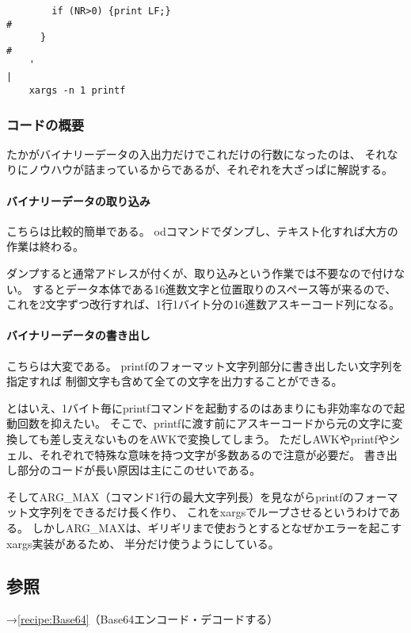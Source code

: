 \noindent
\begin{frameboxit}{160.0mm}
\begin{verbatim}
	    if (NR>0) {print LF;}                                                 #
	  }                                                                       #
	'                                                                         |
	xargs -n 1 printf
\end{verbatim}
\end{frameboxit}

\subsubsection*{コードの概要}

たかがバイナリーデータの入出力だけでこれだけの行数になったのは、
それなりにノウハウが詰まっているからであるが、それぞれを大ざっぱに解説する。

\paragraph{バイナリーデータの取り込み} こちらは比較的簡単である。
odコマンドでダンプし、テキスト化すれば大方の作業は終わる。

ダンプすると通常アドレスが付くが、取り込みという作業では不要なので付けない。
するとデータ本体である16進数文字と位置取りのスペース等が来るので、
これを2文字ずつ改行すれば、1行1バイト分の16進数アスキーコード列になる。

\paragraph{バイナリーデータの書き出し} こちらは大変である。
printfのフォーマット文字列部分に書き出したい文字列を指定すれば
制御文字も含めて全ての文字を出力することができる。

とはいえ、1バイト毎にprintfコマンドを起動するのはあまりにも非効率なので起動回数を抑えたい。
そこで、printfに渡す前にアスキーコードから元の文字に変換しても差し支えないものをAWKで変換してしまう。
ただしAWKやprintfやシェル、それぞれで特殊な意味を持つ文字が多数あるので注意が必要だ。
書き出し部分のコードが長い原因は主にこのせいである。

そしてARG\_{}MAX（コマンド1行の最大文字列長）を見ながらprintfのフォーマット文字列をできるだけ長く作り、
これをxargsでループさせるというわけである。
しかしARG\_{}MAXは、ギリギリまで使おうとするとなぜかエラーを起こすxargs実装があるため、
半分だけ使うようにしている。


\subsection*{参照}

\noindent
→\ref{recipe:Base64}（Base64エンコード・デコードする）
